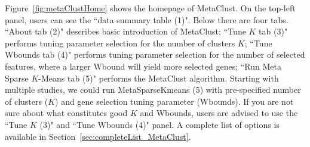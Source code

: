 Figure~\ref{fig:metaClustHome} shows the homepage of MetaClust.
On the top-left panel, 
users can see the ``data summary table {\color{red} (1)}".
Below there are four tabs. 
``About tab {\color{red} (2)}"  describes basic introduction of MetaClust;
``Tune $K$ tab {\color{red} (3)}" performs tuning parameter selection for the number of clusters $K$;
``Tune Wbounds tab {\color{red} (4)}" performs tuning parameter selection for the number of selected features, where a larger Wbound will yield more selected genes;
``Run Meta Sparse $K$-Means tab {\color{red} (5)}" performs the MetaClust algorithm.
Starting with multiple studies, 
we could run MetaSparseKmeans {\color{red} (5)} with pre-specified number of clusters ($K$) and gene selection tuning parameter (Wbounds).
If you are not sure about what constitutes good $K$ and Wbounds, 
users are advised to use the ``Tune $K$ {\color{red} (3)}" and ``Tune Wbounds {\color{red} (4)}" panel.
A complete list of options is available in Section~\ref{sec:completeList_MetaClust}.

